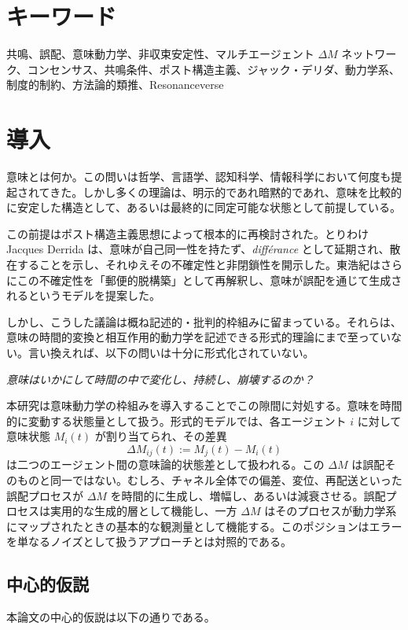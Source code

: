 \documentclass[11pt,a4paper]{article}
\theoremstyle{definition}
\begin{document}
\section*{キーワード}
共鳴、誤配、意味動力学、非収束安定性、マルチエージェント $\Delta M$ ネットワーク、コンセンサス、共鳴条件、ポスト構造主義、ジャック・デリダ、動力学系、制度的制約、方法論的類推、Resonanceverse

\section{導入}

意味とは何か。この問いは哲学、言語学、認知科学、情報科学において何度も提起されてきた。しかし多くの理論は、明示的であれ暗黙的であれ、意味を比較的に安定した構造として、あるいは最終的に同定可能な状態として前提している。

この前提はポスト構造主義思想によって根本的に再検討された。とりわけ Jacques Derrida は、意味が自己同一性を持たず、\textit{différance} として延期され、散在することを示し、それゆえその不確定性と非閉鎖性を開示した。東浩紀はさらにこの不確定性を「郵便的脱構築」として再解釈し、意味が誤配を通じて生成されるというモデルを提案した。

しかし、こうした議論は概ね記述的・批判的枠組みに留まっている。それらは、意味の時間的変換と相互作用的動力学を記述できる形式的理論にまで至っていない。言い換えれば、以下の問いは十分に形式化されていない。

\textit{意味はいかにして時間の中で変化し、持続し、崩壊するのか？}

本研究は意味動力学の枠組みを導入することでこの隙間に対処する。意味を時間的に変動する状態量として扱う。形式的モデルでは、各エージェント $i$ に対して意味状態 $M_i(t)$ が割り当てられ、その差異
\[
\Delta M_{ij}(t) := M_j(t) - M_i(t)
\]
は二つのエージェント間の意味論的状態差として扱われる。この $\Delta M$ は誤配そのものと同一ではない。むしろ、チャネル全体での偏差、変位、再配送といった誤配プロセスが $\Delta M$ を時間的に生成し、増幅し、あるいは減衰させる。誤配プロセスは実用的な生成的層として機能し、一方 $\Delta M$ はそのプロセスが動力学系にマップされたときの基本的な観測量として機能する。このポジションはエラーを単なるノイズとして扱うアプローチとは対照的である。

\subsection{中心的仮説}

本論文の中心的仮説は以下の通りである。
\end{document}
